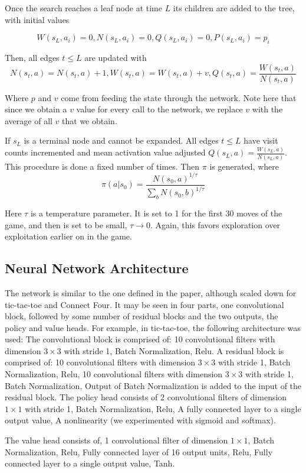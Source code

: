\documentclass[english]{article}
\begin{document}
Once the search reaches a
leaf node at time $L$ its children are added to the tree, with initial values

$$W(s_L, a_i) = 0, N(s_L, a_i) = 0, Q(s_L, a_i) = 0, P(s_L, a_i) = p_i$$

Then, all edges $t \leq L$ are updated with
$$N(s_t,a)=N(s_t,a)+1,W(s_t,a)=W(s_t,a)+v, Q(s_t,a)=\frac{W(s_t,a)}{N(s_t,a)}$$

Where $p$ and $v$ come from feeding the state through the network. Note here
that since we obtain a $v$ value for every call to the network, we replace $v$
with the average of all $v$ that we obtain.

If $s_L$ is a terminal node and cannot be expanded. All edges $t\leq L$ have
visit counts incremented and mean activation value adjusted
$Q(s_L,a)=\frac{W(s_L,a)}{N(s_L,a)}$. This procedure is done a fixed number of
times. Then $\pi$ is generated, where
$$\pi(a|s_0) = \frac{N(s_0,a)^{1/\tau}}{\sum_b N(s_0,b)^{1/\tau}}$$

Here $\tau$ is a temperature parameter. It is set to 1 for the first 30 moves of
the game, and then is set to be small, $\tau \rightarrow 0$. Again, this favors
exploration over exploitation earlier on in the game.


\subsection{Neural Network Architecture}
The network is similar to the one defined in the paper, although scaled down for
tic-tac-toe and Connect Four. It may be seen in four parts, one convolutional
block, followed by some number of residual blocks \cite{Residual} and the two outputs,
the policy and value heads.
For example, in tic-tac-toe, the following architecture was used:
The convolutional block is comprised of: 10 convolutional filters with dimension
$3 \times 3$ with stride 1, Batch Normalization, Relu. 
A residual block is comprised of: 10 convolutional filters with dimension
$3 \times 3$ with stride 1, Batch Normalization, Relu, 10 convolutional filters
with dimension $3 \times 3$ with stride 1, Batch Normalization, Output of Batch
Normalization is added to the input of the residual block.
The policy head consists of 2 convolutional filters of dimension $1 \times 1$
with stride 1, Batch Normalization, Relu, A fully connected layer to a single
output value, A nonlinearity (we experimented with sigmoid and softmax).

The value head consists of, 1 convolutional filter of dimension $1 \times 1$,
Batch Normalization, Relu, Fully connected layer of 16 output units, Relu,
Fully connected layer to a single output value, Tanh.
\end{document}

